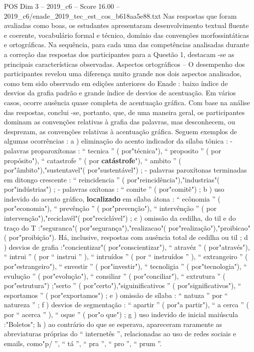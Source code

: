 \begin{textsample}{POS Dim 3 – 2019\_c6 – Score 16.00 – 2019\_c6/enade\_2019\_tec\_est\_cos\_b618aa5e88.txt}
Nas respostas que foram avaliadas como boas, os estudantes apresentaram desenvolvimento textual fluente e coerente, vocabulário formal e técnico, domínio das convenções morfossintáticas e ortográficas.
Na sequência, para cada uma das competências analisadas durante a correção das respostas dos participantes para a Questão 1, destacam -se as principais características observadas.
Aspectos ortográficos – O desempenho dos participantes revelou uma diferença muito grande nos dois aspectos analisados, como tem sido observado em edições anteriores do Enade : baixo índice de desvios da grafia padrão e grande índice de desvios de acentuação.
Em vários casos, ocorre ausência quase completa de acentuação gráfica.
Com base na análise das respostas, conclui -se, portanto, que, de uma maneira geral, os participantes dominam as convenções relativas à grafia das palavras, mas desconhecem, ou desprezam, as convenções relativas à acentuação gráfica.
Seguem exemplos de algumas ocorrências : a ) eliminação do acento indicador da sílaba tônica : - palavras proparoxítonas : “ tecnica ” ( por"técnica"), “ proposito ” ( por propósito"), “ catastrofe ” ( por \textbf{catástrofe}"), “ ambito ” ( por"âmbito"),"sustentavel"( por"sustentável") ; - palavras paroxítonas terminadas em ditongo crescente : “ reincidencia ” ( por"reincidência"),"industrias"( por"indústrias") ; - palavras oxítonas : “ comite ” ( por"comitê") ; b ) uso indevido do acento gráfico, \textbf{localizado} em sílaba átona : “ ecônomia ” ( por"economia"), “ prevênção ” ( por"prevenção"), “ intervênção ” ( por intervenção"),"reciclavél"( por"reciclável") ; c ) omissão da cedilha, do til e do traço do T :"seguranca"( por"segurança"),"realizacao"( por"realização"),"proibicao"( por"proibição").
Há, inclusive, respostas com ausência total de cedilha ou til ; d ) desvios de grafia :"concientizar"( por"conscientizar"), “ atravéz ” ( por"através"), “ intrui ” ( por “ instrui ” ), “ intruídos ” ( por “ instruídos ” ), “ extrangeiro ” ( por"estrangeiro"), “ envestir ” ( por"investir"), “ tecnoligia ” ( por"tecnologia"), “ evulução ” ( por"evolução"), “ consiliar ” ( por"conciliar"), “ extrutura ” ( por"estrutura") ;"serto ” ( por"certo"),"siguinificativos ” ( por"significativos"), “ esportamos ” ( por"exportamos") ; e ) omissão de sílaba : “ natuza ” por “ natureza ” ; f ) desvios de segmentação : “ apartir ” ( por"a partir"), “ a cerca ” ( por “ acerca ” ), “ oque ” ( por"o que") ; g ) uso indevido de inicial maiúscula :"Boletos"; h ) ao contrário do que se esperava, apareceram raramente as abreviaturas próprias do “ internetês ”, relacionadas ao uso de redes sociais e emails, como"p/ ”, “ tá ”, “ pra ”, “ pro ”, “ prum ”.

\end{textsample}

